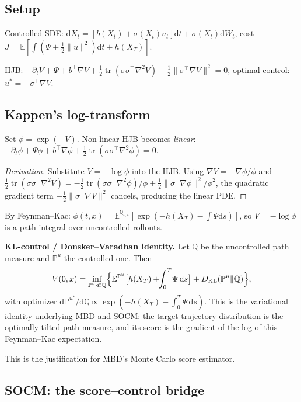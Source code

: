 \documentclass[11pt,letterpaper]{article}
\theoremstyle{plain}
\theoremstyle{definition}
\theoremstyle{remark}
\newcommand{\E}{\mathbb{E}}
\newcommand{\dd}{\mathrm{d}}
\newcommand{\KL}{D_{\mathrm{KL}}}
\newcommand{\tr}{\operatorname{tr}}
\newcommand{\grad}{\nabla}
\newcommand{\norm}[1]{\lVert #1\rVert}
\begin{document}
\begin{advancedmath}

\subsection{Setup}

Controlled SDE: $\dd X_t=[b(X_t)+\sigma(X_t)u_t]\dd t+\sigma(X_t)\dd W_t$,
cost $J=\E[\int(\Psi+\frac{1}{2}\norm{u}^2)\dd t+h(X_T)]$.

HJB: $-\partial_tV+\Psi+b^\top\grad V+\frac{1}{2}\tr(\sigma\sigma^\top\nabla^2V)
-\frac{1}{2}\norm{\sigma^\top\grad V}^2=0$,
optimal control: $u^*=-\sigma^\top\grad V$.

\subsection{Kappen's log-transform}

Set $\phi=\exp(-V)$. Non-linear HJB becomes \emph{linear}:
$-\partial_t\phi+\Psi\phi+b^\top\grad\phi+\frac{1}{2}\tr(\sigma\sigma^\top\nabla^2\phi)=0$.

\begin{proof}[Derivation]
Substitute $V=-\log\phi$ into the HJB. Using
$\grad V=-\grad\phi/\phi$ and
$\tfrac12\tr(\sigma\sigma^\top\nabla^2 V)
=-\tfrac12\tr(\sigma\sigma^\top\nabla^2\phi)/\phi+\tfrac12\norm{\sigma^\top\grad\phi}^2/\phi^2$,
the quadratic gradient term $-\tfrac12\norm{\sigma^\top\grad V}^2$
cancels, producing the linear PDE.
\end{proof}

By Feynman--Kac:
$\phi(t,x)=\E^{\mathbb{Q}_{t,x}}[\exp(-h(X_T)-\int\Psi\dd s)]$,
so $V=-\log\phi$ is a path integral over uncontrolled rollouts.

\textbf{KL-control / Donsker--Varadhan identity.}
Let $\mathbb{Q}$ be the uncontrolled path measure and $\mathbb{P}^u$
the controlled one. Then
\[
  V(0,x)=\inf_{\mathbb{P}^u\ll\mathbb{Q}}\Bigl\{\E^{\mathbb{P}^u}
  \bigl[h(X_T)+\!\!\int_0^T\!\Psi\,\dd s\bigr]+\KL(\mathbb{P}^u\|\mathbb{Q})\Bigr\},
\]
with optimizer $\dd\mathbb{P}^{u^*}/\dd\mathbb{Q}\propto
\exp(-h(X_T)-\int_0^T\Psi\,\dd s)$.
This is the variational identity underlying MBD and SOCM: the target
trajectory distribution is the optimally-tilted path measure, and its
score is the gradient of the log of this Feynman--Kac expectation.

This is the justification for MBD's Monte Carlo score estimator.

\subsection{SOCM: the score--control bridge}


\end{advancedmath}
\end{document}
